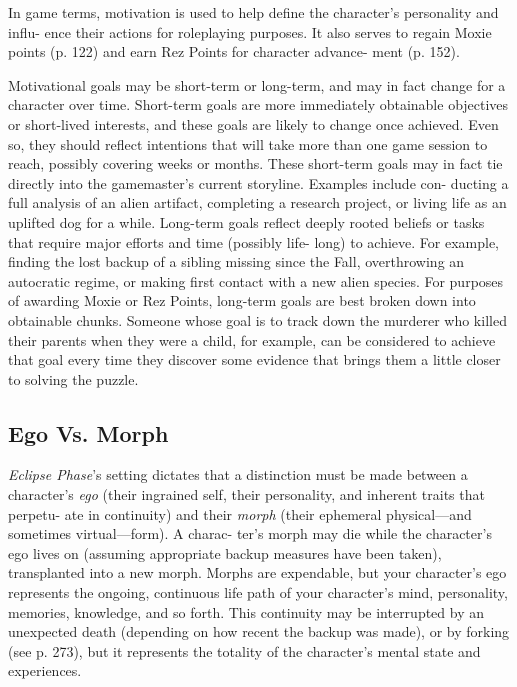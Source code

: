 In game terms, motivation is used to help 
define the character's personality and influ-
ence their actions for roleplaying purposes. 
It also serves to regain Moxie points (p. 122) 
and earn Rez Points for character advance-
ment (p. 152).

Motivational goals may be short-term or long-term, 
and may in fact change for a character over time. 
Short-term goals are more immediately obtainable 
objectives or short-lived interests, and these goals are 
likely to change once achieved. Even so, they should 
reflect intentions that will take more than one game 
session to reach, possibly covering weeks or months. 
These short-term goals may in fact tie directly into the 
gamemaster's current storyline. Examples include con-
ducting a full analysis of an alien artifact, completing 
a research project, or living life as an uplifted dog for a 
while. Long-term goals reflect deeply rooted beliefs or 
tasks that require major efforts and time (possibly life-
long) to achieve. For example, finding the lost backup 
of a sibling missing since the Fall, overthrowing an 
autocratic regime, or making first contact with a new 
alien species. For purposes of awarding Moxie or Rez 
Points, long-term goals are best broken down into 
obtainable chunks. Someone whose goal is to track 
down the murderer who killed their parents when they 
were a child, for example, can be considered to achieve 
that goal every time they discover some evidence that 
brings them a little closer to solving the puzzle.

\subsection{Ego Vs. Morph}

\textit{Eclipse Phase}'s setting dictates that a distinction must 
be made between a character's \textit{ego} (their ingrained 
self, their personality, and inherent traits that perpetu-
ate in continuity) and their \textit{morph} (their ephemeral 
physical—and sometimes virtual—form). A charac-
ter's morph may die while the character's ego lives on 
(assuming appropriate backup measures have been 
taken), transplanted into a new morph. Morphs are 
expendable, but your character's ego represents the 
ongoing, continuous life path of your character's mind, 
personality, memories, knowledge, and so forth. This 
continuity may be interrupted by an unexpected death 
(depending on how recent the backup was made), or 
by forking (see p. 273), but it represents the totality of 
the character's mental state and experiences.

